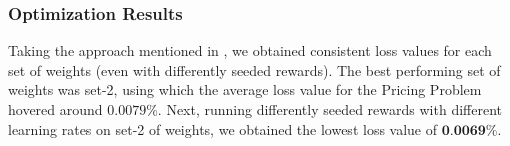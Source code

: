 \subsubsection{Optimization Results} \label{sec:PriProbRes - Optimization}
Taking the approach mentioned in , we obtained consistent loss values for each set of weights (even with differently seeded rewards). The best performing set of weights was set-2, using which the average loss value for the Pricing Problem hovered around $0.0079\%$. Next, running differently seeded rewards with different learning rates on set-2 of weights, we obtained the lowest loss value of $\textbf{0.0069\%}$.


